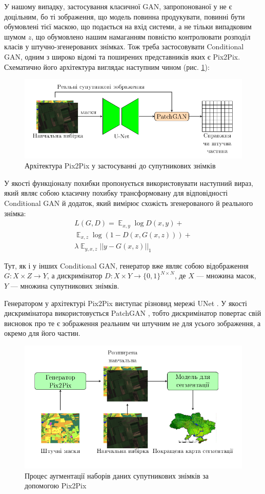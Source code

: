 \documentclass{ConfFTI}
\DeclareMathOperator{\E}{\mathbb{E}}
\begin{document}
У нашому випадку, застосування класичної GAN, запропонованої
у \cite{pix2pix} не є доцільним, бо ті зображення,
що модель повинна продукувати, повинні бути обумовлені
тієї маскою, що подається на вхід системи,
а не тільки випадковим шумом $z$, що обумовлено нашим
намаганням повністю контролювати розподіл класів
у штучно-згенерованих знімках. Тож треба
застосовувати Conditional GAN, одним з широко відомі та поширених
представників яких є Pix2Pix. Схематично його
архітектура виглядає наступним чином (рис. \ref{fig:pix2pix}):

\begin{figure}[ht]
	\centering
	\includegraphics[width= 0.49 \textwidth]{assets/Pix2Pix.png}
	\caption{Архітектура Pix2Pix у застосуванні до супутникових знімків}
	\label{fig:pix2pix}
\end{figure}

У якості функціоналу похибки пропонується використовувати наступний вираз, який являє собою
класичну похибку трансформовану для відповідності Conditional GAN й додаток, який
вимірює схожість згенерованого й реального знімка:
\begin{multline*}
	L(G, D) = \E_{x, y} \log D(x,y) + \\
	\E_{x, z} \log (1 - D(x, G(x, z))) + \\
	\lambda \E_{y, x, z} ||y - G(x, z)||_1
\end{multline*}

Тут, як і у інших Conditional GAN, генератор вже являє собою відображення
$G: X \times Z \rightarrow Y$, а дискримінатор $D: X \times Y \rightarrow \{0, 1\}^{N \times N}$,
де $X$ --- множина масок, $Y$ --- множина супутникових знімків.

Генератором у архітектурі Pix2Pix виступає різновид
мережі UNet \cite{unet}. У якості дискримінатора використовується PatchGAN \cite{pix2pix}, тобто
дискримінатор повертає свій висновок про те є зображення реальним чи штучним не для
усього зображення, а окремо для його частин.

\begin{figure}[ht]
	\centering
	\includegraphics[width=0.49 \textwidth]{assets/pipline.png}
	\caption{Процес аугментації наборів даних супутникових знімків за допомогою Pix2Pix}
	\label{fig:pipline}
\end{figure}
\end{document}
